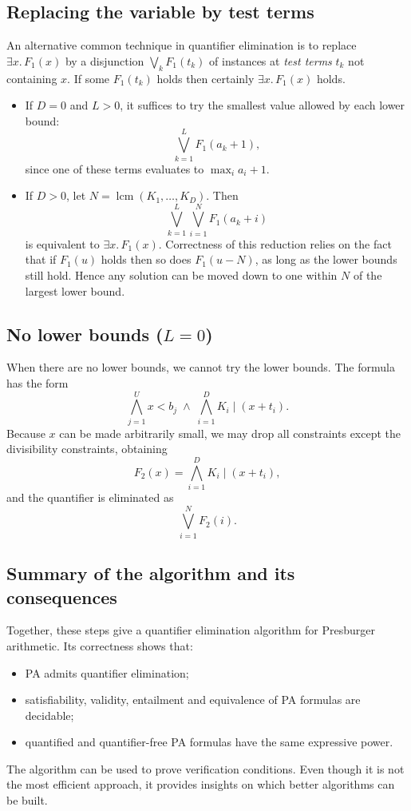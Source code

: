 \subsection{Replacing the variable by test terms}
 
An alternative common technique in quantifier elimination is to replace $\exists x.\, F_1(x)$ by a disjunction $\bigvee_k F_1(t_k)$ of instances at \emph{test terms} $t_k$ not containing $x$. If some $F_1(t_k)$ holds then certainly $\exists x.\, F_1(x)$ holds.
 
\begin{itemize}
  \item If $D = 0$ and $L > 0$, it suffices to try the smallest value allowed by each lower bound:
  \[
  \bigvee_{k=1}^{L} F_1(a_k + 1),
  \]
  since one of these terms evaluates to $\max_i a_i + 1$.
  \item If $D > 0$, let $N = \operatorname{lcm}(K_1, \ldots, K_D)$. Then
  \[
  \bigvee_{k=1}^{L} \bigvee_{i=1}^{N} F_1(a_k + i)
  \]
  is equivalent to $\exists x.\, F_1(x)$. Correctness of this reduction relies on the fact that if $F_1(u)$ holds then so does $F_1(u - N)$, as long as the lower bounds still hold. Hence any solution can be moved down to one within $N$ of the largest lower bound.
\end{itemize}
 
\subsection{No lower bounds ($L = 0$)}
 
When there are no lower bounds, we cannot try the lower bounds. The formula has the form
\[
\bigwedge_{j=1}^{U} x < b_j \;\wedge\; \bigwedge_{i=1}^{D} K_i \mid (x + t_i).
\]
Because $x$ can be made arbitrarily small, we may drop all constraints except the divisibility constraints, obtaining
\[
F_2(x) = \bigwedge_{i=1}^{D} K_i \mid (x + t_i),
\]
and the quantifier is eliminated as
\[
\bigvee_{i=1}^{N} F_2(i).
\]
 
\subsection{Summary of the algorithm and its consequences}
 
Together, these steps give a quantifier elimination algorithm for Presburger arithmetic. Its correctness shows that:
\begin{itemize}
  \item PA admits quantifier elimination;
  \item satisfiability, validity, entailment and equivalence of PA formulas are decidable;
  \item quantified and quantifier-free PA formulas have the same expressive power.
\end{itemize}
The algorithm can be used to prove verification conditions. Even though it is not the most efficient approach, it provides insights on which better algorithms can be built.
 
